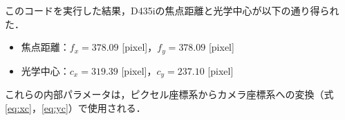 このコードを実行した結果，D435iの焦点距離と光学中心が以下の通り得られた．

\begin{itemize}
  \item 焦点距離：$f_x = 378.09$ [pixel]，$f_y = 378.09$ [pixel]
  \item 光学中心：$c_x = 319.39$ [pixel]，$c_y = 237.10$ [pixel]
\end{itemize}

これらの内部パラメータは，ピクセル座標系からカメラ座標系への変換（式\eqref{eq:xc}，\eqref{eq:yc}）で使用される．